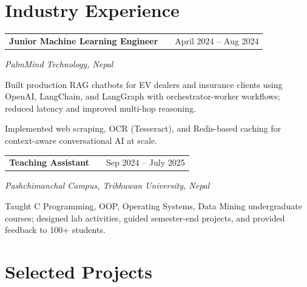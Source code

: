 \documentclass[a4paper,10pt]{article}
\makeatletter
\newenvironment{jobshort}[2]
    {
    \begin{tabularx}{\linewidth}{@{}l X r@{}}
    \textbf{#1} & \hfill & #2 \\[1.5pt]
    \end{tabularx}
    }
    {}
\makeatother
\begin{document}
\section{Industry Experience}

\begin{jobshort}{Junior Machine Learning Engineer}{April 2024 -- Aug 2024}
\textit{PalmMind Technology, Nepal}
\begin{itemize}[itemsep=-5pt]
{
    \item Built production RAG chatbots for EV dealers and insurance clients using OpenAI, LangChain, and LangGraph with orchestrator-worker workflows; reduced latency and improved multi-hop reasoning.
    \item Implemented web scraping, OCR (Tesseract), and Redis-based caching for context-aware conversational AI at scale.
}
\end{itemize}
\end{jobshort}

\vspace{4pt}
\begin{jobshort}{Teaching Assistant }{Sep 2024 -- July 2025}
\textit{Pashchimanchal Campus, Tribhuwan University, Nepal}
\begin{itemize}[itemsep=-5pt]
{
    \item Taught C Programming, OOP, Operating Systems, Data Mining undergraduate courses; designed lab activities, guided semester-end projects, and provided feedback to 100+ students.
}
\end{itemize}
\end{jobshort}

\section{Selected Projects}
\end{document}
